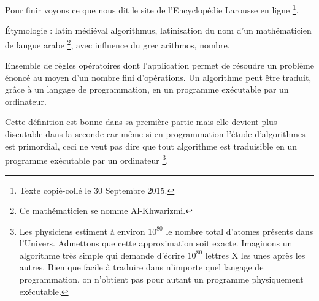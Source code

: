 Pour finir voyons ce que nous dit le site de l'Encyclopédie Larousse en ligne
\footnote{
	Texte copié-collé le 30 Septembre 2015.
}.

\vspace{-0.3em}

\begin{Quote}[author = Encyclopédie Larousse en ligne]
	Étymologie : latin médiéval algorithmus, latinisation du nom d'un mathématicien de langue arabe
	\footnote{Ce mathématicien se nomme Al-Khwarizmi.},
	avec influence du grec arithmos, nombre.

	\medskip
	
	Ensemble de règles opératoires dont l'application permet de résoudre un problème énoncé au moyen d'un nombre fini d'opérations. Un algorithme peut être traduit, grâce à un langage de programmation, en un programme exécutable par un ordinateur.
\end{Quote}

\vspace{-0.3em}

Cette définition est bonne dans sa première partie mais elle devient plus discutable dans la seconde car même si en programmation l'étude d'algorithmes est primordial, ceci ne veut pas dire que tout algorithme est traduisible en un programme exécutable par un ordinateur
\footnote{
	Les physiciens estiment à environ $10^{80}$ le nombre total d'atomes présents dans l'Univers. Admettons que cette approximation soit exacte. Imaginons un algorithme très simple qui demande d'écrire $10^{80}$ lettres X les unes après les autres. Bien que facile à traduire dans n'importe quel langage de programmation, on n'obtient pas pour autant un programme physiquement exécutable.
}.